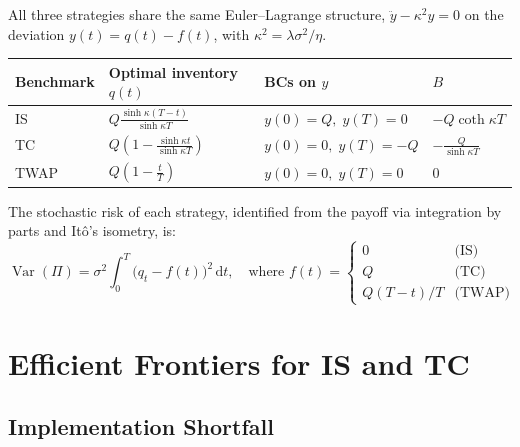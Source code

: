 \documentclass[12pt, a4paper]{article}
\newcommand{\Var}{\operatorname{Var}}
\newcommand{\dd}{\,\mathrm{d}}
\newcommand{\kap}{\kappa}
\begin{document}
\begin{resultbox}
All three strategies share the same Euler--Lagrange structure,
$\ddot y - \kap^2 y = 0$ on the deviation $y(t) = q(t) - f(t)$,
with $\kap^2 = \lambda\sigma^2/\eta$.

\medskip
\begin{center}
  \renewcommand{\arraystretch}{2.0}
  \begin{tabular}{@{}llll@{}}
    \toprule
    \textbf{Benchmark} & \textbf{Optimal inventory} $q(t)$ & \textbf{BCs on $y$} & \textbf{$B$} \\
    \midrule
    IS & $\displaystyle Q\frac{\sinh\kap(T-t)}{\sinh\kap T}$
       & $y(0)=Q,\; y(T)=0$
       & $-Q\coth\kap T$ \\[8pt]
    TC & $\displaystyle Q\!\left(1 - \frac{\sinh\kap t}{\sinh\kap T}\right)$
       & $y(0)=0,\; y(T)=-Q$
       & $\displaystyle -\frac{Q}{\sinh\kap T}$ \\[8pt]
    TWAP & $\displaystyle Q\!\left(1 - \frac{t}{T}\right)$
         & $y(0)=0,\; y(T)=0$
         & $0$ \\
    \bottomrule
  \end{tabular}
\end{center}

\medskip
The stochastic risk of each strategy, identified from the payoff via
integration by parts and It\^{o}'s isometry, is:
\[
  \Var(\Pi)
  = \sigma^2\!\int_0^T\!\bigl(q_t - f(t)\bigr)^2\dd t,
  \quad\text{where }
  f(t) = \begin{cases} 0 & \text{(IS)} \\ Q & \text{(TC)} \\ Q(T-t)/T & \text{(TWAP)} \end{cases}
\]
\end{resultbox}

\section{Efficient Frontiers for IS and TC}

\subsection{Implementation Shortfall}
\end{document}
